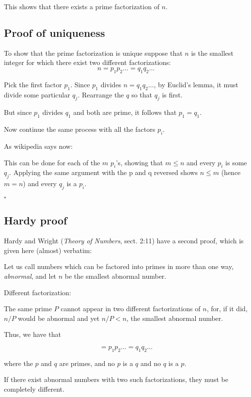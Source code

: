 \documentclass[11pt, oneside]{article}
\begin{document}
This shows that there exists a prime factorization of $n$.

\subsection*{Proof of uniqueness}

To show that the prime factorization is unique suppose that $n$ is the smallest integer for which there exist two different factorizations:
\[ n = p_1 p_2 \dots = q_1 q_2 \dots \]
    
Pick the first factor $p_1$.  Since $p_1$ divides $n = q_1 q_2 \dots$, by Euclid's lemma, it must divide some particular $q_j$.  Rearrange the $q$ so that $q_j$ is first.

But since $p_1$ divides $q_1$ and both are prime, it follows that $p_1 = q_1$. 

Now continue the same process with all the factors $p_i$.

As wikipedia says now:

    This can be done for each of the $m$ $p_i$'s, showing that $m \le n$ and every $p_i$ is some $q_j$. Applying the same argument with the p and q reversed shows $n \le m$ (hence $m = n$) and every $q_j$ is a $p_i$.
    
$\square$
    
\subsection*{Hardy proof}

Hardy and Wright (\emph{Theory of Numbers}, sect. 2:11) have a second proof, which is given here (almost) verbatim:

    Let us call numbers which can be factored into primes in more than one way, \emph{abnormal}, and let $n$ be the smallest abnormal number.

Different factorization:

The same prime $P$ cannot appear in two different factorizations of $n$, for, if it did, $n/P$ would be abnormal and yet $n/P < n$, the smallest abnormal number.

Thus, we have that

\[  = p_1 p_2 \dots = q_1 q_2 \dots \]
    
where the $p$ and $q$ are primes, and no $p$ is a $q$ and no $q$ is a $p$.

If there exist abnormal numbers with two such factorizations, they must be completely different.
\end{document}
